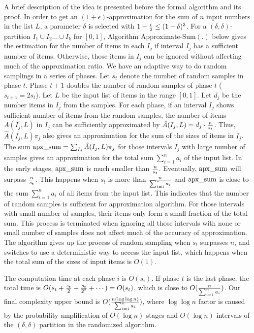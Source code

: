 \documentclass[runningheads]{llncs}
\newcommand{\timecomplexity}{O({n(\log\log n)\over \sum_{i=1}^n a_i})}
\newcommand{\appsum}{{\rm apx\_sum}}
\begin{document}
A brief description of the idea is presented before the formal
algorithm and its proof. In order to get an
$(1+\epsilon)$-approximation for the sum of $n$ input numbers in the
list $L$, a parameter $\delta$ is selected with $1-{\epsilon\over
2}\le (1-\delta)^3$. For a $(\delta,\delta)$-partition $I_1\cup
I_2\ldots \cup I_k$ for $[0,1]$, Algorithm Approximate-Sum$(.)$
below gives the estimation for the number of items in each $I_j$ if
interval $I_j$ has a sufficient number of items. Otherwise, those
items in $I_j$ can be ignored without affecting much of the
approximation ratio. We have an adaptive way to do random samplings
in a series of phases. Let $s_t$ denote the number of random samples
in phase $t$. Phase $t+1$ doubles the number of random samples of
phase $t$ ($s_{t+1}=2s_t$). Let $L$ be the input list of items in
the range $[0,1]$. Let $d_j$ be the number items in $I_j$ from the
samples. For each phase, if an interval $I_j$ shows sufficient
number of items from the random samples, the number of items
$A(I_j,L)$ in $I_j$ can be sufficiently approximated by
$\hat{A}(I_j,L)=d_j\cdot {n\over s_t}$. Thus, $\hat{A}(I_j,L)\pi_j$
also gives an approximation for the sum of the sizes of items in
$I_j$. The sum $\appsum=\sum_{I_j}\hat{A}(I_j,L)\pi_j$ for those
intervals $I_j$ with large number of samples gives an approximation
for the total sum $\sum_{i=1}^na_i$ of the input list.  In the early
stages, $\appsum$ is much smaller than ${n\over s_t}$. Eventually,
$\appsum$ will surpass ${n\over s_t}$. This happens when $s_t$ is
more than ${n\over \sum_{i=1}^n a_i}$ and $\appsum$ is close to the
sum $\sum_{i=1}^n a_i$ of all items from the input list. This
indicates that the number of random samples is sufficient for
approximation algorithm. For those intervals with small number of
samples, their items only form a small fraction of the total sum.
This process is terminated when ignoring all those intervals with
none or small number of samples does not affect much of the accuracy
of approximation. The algorithm gives up the process of random
sampling when $s_t$ surpasses $n$, and switches to use a
deterministic way to access the input list, which happens when the
total sum of the sizes of input items is $O(1)$.

The computation time at each phase $i$ is $O(s_i)$. If phase $t$ is
the last phase, the total time is $O(s_t+{s_t\over 2}+{s_t\over
2^2}+\cdots)=O(s_t)$, which is close to $O({n\over \sum_{i=1}^n
a_i})$. Our final complexity upper bound is $\timecomplexity$, where
$\log\log n$ factor is caused by the probability amplification of
$O(\log n)$ stages and $O(\log n)$ intervals of the
$(\delta,\delta)$ partition in the randomized algorithm.
\end{document}
